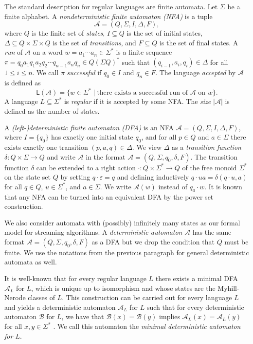 \documentclass{theoretics}
\newcommand{\A}{\mathcal{A}}
\newcommand{\B}{\mathcal{B}}
\renewcommand{\L}{\mathsf{L}}
\newcommand{\eps}{\varepsilon}
\renewcommand{\leq}{\leqslant}
\renewcommand{\le}{\leq}
\begin{document}
The standard description for regular languages are finite automata.
Let $\Sigma$ be a finite alphabet.
A {\em nondeterministic finite automaton (NFA)} is a tuple 
\[ \A = (Q,\Sigma,I,\Delta,F), \]
where $Q$ is the finite set of {\em states}, $I \subseteq Q$ is the set of initial states,
$\Delta \subseteq Q \times \Sigma \times Q$ is the set of {\em transitions},
and $F \subseteq Q$ is the set of final states.
A {\em run} of $\A$ on a word $w = a_1 \cdots a_n \in \Sigma^*$ is a finite sequence
$\pi = q_0 a_1 q_1 a_2 q_2 \cdots q_{n-1} a_n q_n \in Q (\Sigma Q)^*$
such that $(q_{i-1},a_i,q_i) \in \Delta$ for all $1 \le i \le n$.
We call $\pi$ {\em successful} if $q_0 \in I$ and $q_n \in F$.
The language {\em accepted} by $\A$ is defined as
\[
	\L(\A) = \{ w \in \Sigma^* \mid \text{there exists a successful run of $\A$ on $w$} \}.
\]
A language $L \subseteq \Sigma^*$ is {\em regular} if it is accepted by
some NFA.
The {\em size} $|\A|$ is defined as the number of states.

A {\em \mbox{(left-)}\allowbreak deterministic finite automaton (DFA)}
is an NFA $\A = (Q,\Sigma,I,\Delta,F)$,
where $I = \{q_0\}$ has exactly one initial state $q_0$,
and for all $p \in Q$ and $a \in \Sigma$ there exists exactly one transition $(p,a,q) \in \Delta$.
We view $\Delta$ as a {\em transition function} $\delta \colon Q \times \Sigma \to Q$
and write $\A$ in the format $\A = (Q,\Sigma,q_0,\delta,F)$.
The transition function $\delta$ can be extended
to a right action $\cdot \colon Q \times \Sigma^* \to Q$
of the free monoid $\Sigma^*$ on the state set $Q$
by setting $q \cdot \eps = q$
and defining inductively $q \cdot ua = \delta(q \cdot u,a)$ for all $q \in Q$,
$u \in \Sigma^*$, and $a \in \Sigma$.
We write $\A(w)$ instead of $q_0 \cdot w$.
It is known that any NFA can be turned into an equivalent DFA by the power set construction.

We also consider automata with (possibly) infinitely many states as our formal model for streaming algorithms.
A {\em deterministic automaton} $\A$ has the same format $\A = (Q,\Sigma,q_0,\delta,F)$
as a DFA but we drop the condition that $Q$ must be finite.
We use the notations from the previous paragraph for general deterministic automata as well.

It is well-known that for every regular language $L$ there exists a minimal DFA $\A_L$ for $L$,
which is unique up to isomorphism and whose states are the Myhill-Nerode classes of $L$.
This construction can be carried out for every language $L$ and yields a
deterministic automaton $\A_L$ for $L$ such that for every deterministic automaton $\B$ 
for $L$, we have that $\B(x) = \B(y)$ implies $\A_L(x) = \A_L(y)$ for all $x,y \in \Sigma^*$ \cite[Chapter~III,~Theorem~5.2]{Eilenberg74}.
We call this automaton the {\em minimal deterministic automaton for $L$}.
\end{document}
